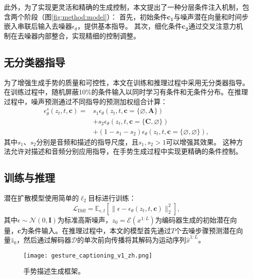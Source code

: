 此外，为了实现更灵活和精确的生成控制，本文提出了一种分层条件注入机制，包含两个阶段（图\ref{fig:method:model}）：
首先，初始条件$\mathbf{c_1}$与噪声潜在向量和时间步嵌入串联后输入去噪器$\epsilon_\theta$，提供基本指导。
其次，细化条件$\mathbf{c_2}$通过交叉注意力机制在去噪器内部整合，实现精细的控制调整。

\subsection{无分类器指导}
为了增强生成手势的质量和可控性，本文在训练和推理过程中采用无分类器指导\cite{ho2022classifier}。在训练过程中，随机屏蔽10\%的条件输入以同时学习有条件和无条件分布。在推理过程中，噪声预测通过不同指导的预测加权组合计算：
\begin{equation}
  \begin{split}
      \epsilon_\theta^s(z_t, t, \mathbf{c}) = & s_1 \epsilon_\theta(z_t, t, \mathbf{c}=\{\varnothing, \mathbf{A}\}) \\
      & + s_2 \epsilon_\theta(z_t, t, \mathbf{c}=\{\mathbf{C}, \varnothing\}) \\
      & + (1 - s_1 - s_2) \epsilon_\theta(z_t, t, \mathbf{c}=\{\varnothing, \varnothing\}),
  \end{split}
\end{equation}
其中$s_1$、$s_2$分别是音频和描述的指导尺度，且$s_1, s_2 > 1$可以增强其效果。
这种方法允许对描述和音频分别应用指导，在手势生成过程中实现更精确的条件控制。

\subsection{训练与推理}
潜在扩散模型使用简单的$\ell_2$目标进行训练\cite{ho2020ddpm, chen2023executing}：
\begin{equation}
  \mathcal{L}_{\text{Diff}} = \mathbb{E}_{\epsilon,t}[\|\epsilon - \epsilon_\theta(z_t, t, \mathbf{c})\|_2^2],
\end{equation}
其中$\epsilon \sim \mathcal{N}(0,\mathbf{I})$为标准高斯噪声，$z_0 = \mathcal{E}(x^{1:L})$为编码器生成的初始潜在向量，$\mathbf{c}$为条件输入。在推理过程中，本文的模型首先通过$T$个去噪步骤预测潜在向量$\hat{z}_0$，然后通过解码器$\mathcal{D}$的单次前向传播将其解码为运动序列$\hat{x}^{1:L}$。

\begin{figure*}[t]
  \centering
  \texttt{[image: gesture\_captioning\_v1\_zh.png]}
  \caption{手势描述生成框架。}
  \label{fig:method:captioning}
\end{figure*}

